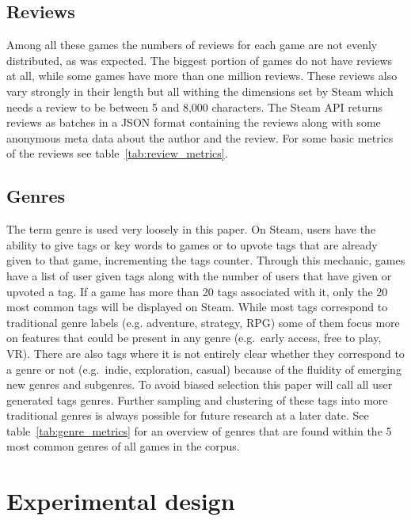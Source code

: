 \documentclass[11pt, a4paper]{article}
\begin{document}



\subsection{Reviews}\label{subsec:reviews}
Among all these games the numbers of reviews for each game are not evenly distributed, as was expected.
The biggest portion of games do not have reviews at all, while some games have more than one million reviews.
These reviews also vary strongly in their length but all withing the dimensions set by Steam which needs a review to
be between 5 and 8,000 characters.
The Steam API returns reviews as batches in a JSON format containing the reviews along with some anonymous meta data
about the author and the review.
For some basic metrics of the reviews see table~\ref{tab:review_metrics}.




\subsection{Genres}\label{subsec:genres}
The term genre is used very loosely in this paper.
On Steam, users have the ability to give tags or key words to games or to upvote tags that are already given to that
game, incrementing the tags counter.
Through this mechanic, games have a list of user given tags along with the number of users that have given or upvoted
a tag.
If a game has more than 20 tags associated with it, only the 20 most common tags will be displayed on Steam.
While most tags correspond to traditional genre labels (e.g. adventure, strategy, RPG) some of them focus more on
features that could be present in any genre (e.g.\ early access, free to play, VR). There are also tags where it is
not entirely clear whether they correspond to a genre or not (e.g.\ indie, exploration, casual) because of the fluidity
of emerging new genres and subgenres.
To avoid biased selection this paper will call all user generated tags genres.
Further sampling and clustering of these tags into more traditional genres is always possible for future research at a
later date.
See table~\ref{tab:genre_metrics} for an overview of genres that are found within the 5 most common genres of all games
in the corpus.





\section{Experimental design}\label{sec:experimental-design}
\end{document}
